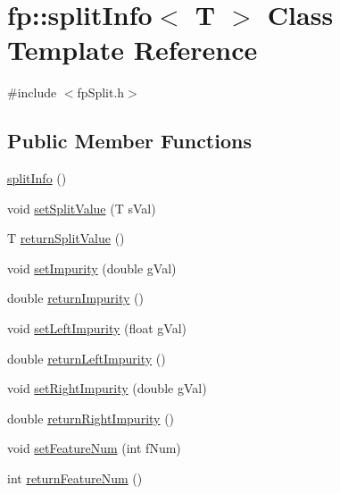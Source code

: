 \hypertarget{classfp_1_1splitInfo}{}\section{fp\+:\+:split\+Info$<$ T $>$ Class Template Reference}
\label{classfp_1_1splitInfo}


{\ttfamily \#include $<$fp\+Split.\+h$>$}

\subsection*{Public Member Functions}
\begin{DoxyCompactItemize}
\item 
\hyperlink{classfp_1_1splitInfo_ae6d4a528ee8ef6e3c3ab2c8d5238723f}{split\+Info} ()
\item 
void \hyperlink{classfp_1_1splitInfo_afeb499dae144aa8e8d55ef5fe206bb3c}{set\+Split\+Value} (T s\+Val)
\item 
T \hyperlink{classfp_1_1splitInfo_a7737702d3a91cca2ca82576ab4ff7b03}{return\+Split\+Value} ()
\item 
void \hyperlink{classfp_1_1splitInfo_a3e712b7887bd06f14ae87f6ab1ca25f6}{set\+Impurity} (double g\+Val)
\item 
double \hyperlink{classfp_1_1splitInfo_aa4890dfa907252fc9a669a0e328acef2}{return\+Impurity} ()
\item 
void \hyperlink{classfp_1_1splitInfo_a99e02b66f4abb2ec115181bad4e938cf}{set\+Left\+Impurity} (float g\+Val)
\item 
double \hyperlink{classfp_1_1splitInfo_afa74525821fe756dac9c71a72cddf58c}{return\+Left\+Impurity} ()
\item 
void \hyperlink{classfp_1_1splitInfo_a495129a74f5f234ab4b412eab5f929dc}{set\+Right\+Impurity} (double g\+Val)
\item 
double \hyperlink{classfp_1_1splitInfo_afe9b9329a28de129e8114d52662c3741}{return\+Right\+Impurity} ()
\item 
void \hyperlink{classfp_1_1splitInfo_a3db044a5d9500312ea1b006c3dd1387c}{set\+Feature\+Num} (int f\+Num)
\item 
int \hyperlink{classfp_1_1splitInfo_a6b0cdcf767630429747281fd31691967}{return\+Feature\+Num} ()
\end{DoxyCompactItemize}
